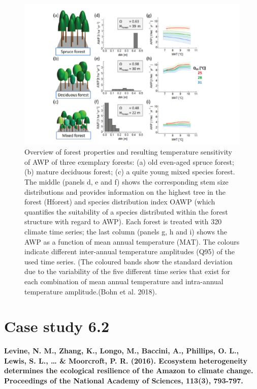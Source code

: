 \documentclass[12pt,oneside]{book}
\begin{document}
\begin{figure}

{\centering \includegraphics[width=0.8\linewidth]{figures/chap6/f636_bohn2} 

}

\caption{Overview of forest properties and resulting temperature sensitivity of AWP of three exemplary forests: (a) old even-aged spruce forest; (b) mature deciduous forest; (c) a quite young mixed species forest. The middle (panels d, e and f) shows the corresponding stem size distributions and provides information on the highest tree in the forest (Hforest) and species distribution index OAWP (which quantifies the suitability of a species distributed within the forest structure with regard to AWP). Each forest is treated with 320 climate time series; the last column (panels g, h and i) shows the AWP as a function of mean annual temperature (MAT). The colours indicate different inter-annual temperature amplitudes (Q95) of the used time series. (The coloured bands show the standard deviation due to the variability of the five different time series that exist for each combination of mean annual temperature and intra-annual temperature amplitude.(Bohn et al. 2018).}\label{fig:f636}
\end{figure}

\section{Case study 6.2}\label{case-study-6.2}

\textbf{Levine, N. M., Zhang, K., Longo, M., Baccini, A., Phillips, O.
L., Lewis, S. L., \ldots{} \& Moorcroft, P. R. (2016). Ecosystem
heterogeneity determines the ecological resilience of the Amazon to
climate change. Proceedings of the National Academy of Sciences, 113(3),
793-797.}
\end{document}

